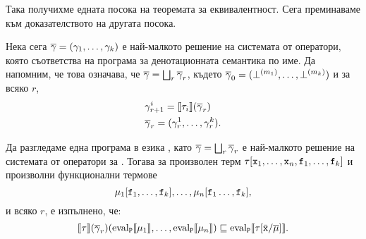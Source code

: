 Така получихме едната посока на теоремата за еквивалентност.
Сега преминаваме към доказателството на другата посока.

Нека сега $\overline{\gamma} = (\gamma_1,\dots,\gamma_k)$ е най-малкото решение на системата от оператори, която съответства на програма 
за денотационната семантика по име.
Да напомним, че това означава, че $\overline{\gamma} = \bigsqcup_r \overline{\gamma}_r$, 
където $\overline{\gamma}_0 = (\bot^{(m_1)},\dots,\bot^{(m_k)})$ и за всяко $r$,
\begin{align*}
  & \gamma^i_{r+1} = \llbracket{\tau_i}\rrbracket(\overline{\gamma}_r)\\
  & \overline{\gamma}_r = ( \gamma^1_r, \dots, \gamma^k_r).
\end{align*}



\begin{proposition}
  \label{pr:op-name-inclusion2}
  Да разгледаме една програма  в езика \FUN, като
  $\overline{\gamma} = \bigsqcup_r\overline{\gamma}_r$ е най-малкото решение на системата от оператори за .
  Тогава за произволен терм $\tau[\texttt{x}_1,\dots,\texttt{x}_n,\texttt{f}_1,\dots,\texttt{f}_k]$ и
  произволни функционални термове
  \[\mu_1[\texttt{f}_1,\dots,\texttt{f}_k],\dots,\mu_n[\texttt{f}_1\dots,\texttt{f}_k],\]
  и всяко $r$, е изпълнено, че:
  \[\llbracket{\tau}\rrbracket(\overline{\gamma}_r)(\text{eval}_{\texttt{P}}\llbracket{{\mu_1}}\rrbracket,\dots,\text{eval}_{\texttt{P}}\llbracket{{\mu_n}}\rrbracket) \sqsubseteq \text{eval}_{\texttt{P}}\llbracket{{\tau[\bar{\texttt{x}}/\overline{\mu}]}}\rrbracket.\]
\end{proposition}
